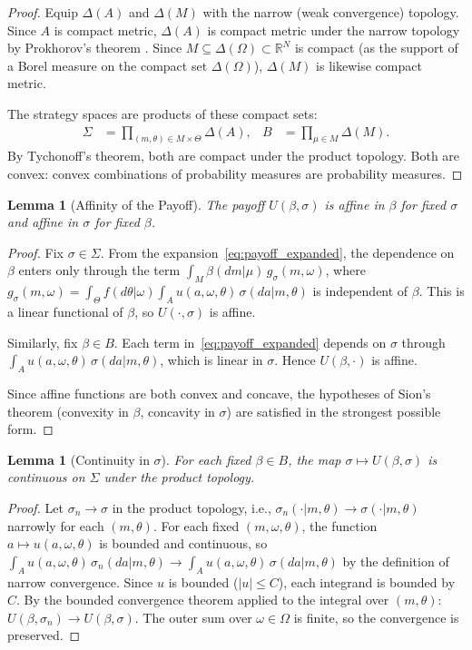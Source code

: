 \documentclass[11pt,a4paper]{article}
\newtheorem{lemma}[theorem]{Lemma}
\theoremstyle{definition}
\newcommand{\R}{\mathbb{R}}
\newcommand{\DeltaA}{\Delta(A)}
\newcommand{\DeltaO}{\Delta(\Omega)}
\newcommand{\DeltaM}{\Delta(M)}
\begin{document}
\begin{proof}
Equip $\DeltaA$ and $\DeltaM$ with the narrow (weak convergence) topology.
Since $A$ is compact metric, $\DeltaA$ is compact metric under the narrow topology by Prokhorov's theorem \citep{prokhorov1956convergence,billingsley1999convergence}.
Since $M\subseteq\DeltaO\subset\R^N$ is compact (as the support of a Borel measure on the compact set $\DeltaO$), $\DeltaM$ is likewise compact metric.

The strategy spaces are products of these compact sets:
\begin{align}
\Sigma &= \prod_{(m,\theta)\in M\times\Theta} \DeltaA, &
B &= \prod_{\mu\in M} \DeltaM.
\end{align}
By Tychonoff's theorem, both are compact under the product topology.
Both are convex: convex combinations of probability measures are probability measures.
\end{proof}

\begin{lemma}[Affinity of the Payoff]
\label{lem:affine}
The payoff $U(\beta,\sigma)$ is affine in $\beta$ for fixed $\sigma$ and affine in $\sigma$ for fixed $\beta$.
\end{lemma}

\begin{proof}
Fix $\sigma\in\Sigma$.
From the expansion~\eqref{eq:payoff_expanded}, the dependence on $\beta$ enters only through the term
$\int_M\beta(dm|\mu)\,g_\sigma(m,\omega)$,
where $g_\sigma(m,\omega) = \int_\Theta f(d\theta|\omega)\int_A u(a,\omega,\theta)\,\sigma(da|m,\theta)$ is independent of $\beta$.
This is a linear functional of $\beta$, so $U(\cdot,\sigma)$ is affine.

Similarly, fix $\beta\in B$.
Each term in~\eqref{eq:payoff_expanded} depends on $\sigma$ through $\int_A u(a,\omega,\theta)\,\sigma(da|m,\theta)$, which is linear in $\sigma$.
Hence $U(\beta,\cdot)$ is affine.

Since affine functions are both convex and concave, the hypotheses of Sion's theorem (convexity in $\beta$, concavity in $\sigma$) are satisfied in the strongest possible form.
\end{proof}

\begin{lemma}[Continuity in $\sigma$]
\label{lem:cont_sigma}
For each fixed $\beta\in B$, the map $\sigma\mapsto U(\beta,\sigma)$ is continuous on $\Sigma$ under the product topology.
\end{lemma}

\begin{proof}
Let $\sigma_n\to\sigma$ in the product topology, i.e., $\sigma_n(\cdot|m,\theta)\to\sigma(\cdot|m,\theta)$ narrowly for each $(m,\theta)$.
For each fixed $(m,\omega,\theta)$, the function $a\mapsto u(a,\omega,\theta)$ is bounded and continuous, so
$\int_A u(a,\omega,\theta)\,\sigma_n(da|m,\theta) \to \int_A u(a,\omega,\theta)\,\sigma(da|m,\theta)$
by the definition of narrow convergence.
Since $u$ is bounded ($|u|\le C$), each integrand is bounded by $C$.
By the bounded convergence theorem applied to the integral over $(m,\theta)$:
$U(\beta,\sigma_n)\to U(\beta,\sigma)$.
The outer sum over $\omega\in\Omega$ is finite, so the convergence is preserved.
\end{proof}
\end{document}
